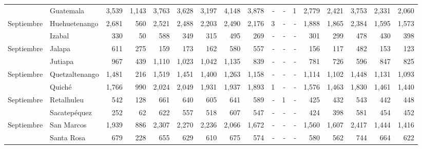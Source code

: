 \begin{landscape}
\begin{center}
\begin{longtable}{llrrrrrrrrrrrrrrr}
			\rowcolor{color1!5!white}\multicolumn{1}{l}{	\footnotesize	 Septiembre 	}&	 Guatemala 	&	 3,539 	&	 1,143 	&	 3,763 	&	 3,628 	&	 3,197 	&	 4,148 	&	 3,878 	&	 -   	&	 -   	&	 1 	&	 2,779 	&	 2,421 	&	 3,753 	&	 2,331 	&	 2,060 	\\
			\multicolumn{1}{l}{	\footnotesize	 Septiembre 	}&	 Huehuetenango 	&	 2,681 	&	 560 	&	 2,521 	&	 2,488 	&	 2,203 	&	 2,490 	&	 2,176 	&	 3 	&	 -   	&	 -   	&	 1,888 	&	 1,865 	&	 2,384 	&	 1,595 	&	 1,573 	\\
			\rowcolor{color1!5!white}\multicolumn{1}{l}{	\footnotesize	 Septiembre 	}&	 Izabal 	&	 330 	&	 50 	&	 588 	&	 349 	&	 315 	&	 495 	&	 269 	&	 -   	&	 -   	&	 -   	&	 301 	&	 299 	&	 478 	&	 430 	&	 398 	\\
			\multicolumn{1}{l}{	\footnotesize	 Septiembre 	}&	 Jalapa 	&	 611 	&	 275 	&	 159 	&	 173 	&	 162 	&	 580 	&	 557 	&	 -   	&	 -   	&	 -   	&	 156 	&	 117 	&	 482 	&	 153 	&	 123 	\\
			\rowcolor{color1!5!white}\multicolumn{1}{l}{	\footnotesize	 Septiembre 	}&	 Jutiapa 	&	 967 	&	 439 	&	 1,110 	&	 1,023 	&	 1,042 	&	 1,135 	&	 839 	&	 -   	&	 -   	&	 -   	&	 781 	&	 726 	&	 596 	&	 847 	&	 825 	\\
			\multicolumn{1}{l}{	\footnotesize	 Septiembre 	}&	 Quetzaltenango 	&	 1,481 	&	 216 	&	 1,519 	&	 1,451 	&	 1,400 	&	 1,263 	&	 1,158 	&	 -   	&	 -   	&	 -   	&	 1,114 	&	 1,102 	&	 1,448 	&	 1,131 	&	 1,093 	\\
			\rowcolor{color1!5!white}\multicolumn{1}{l}{	\footnotesize	 Septiembre 	}&	 Quiché 	&	 1,766 	&	 990 	&	 2,024 	&	 2,049 	&	 1,931 	&	 1,937 	&	 1,893 	&	 1 	&	 -   	&	 -   	&	 1,576 	&	 1,463 	&	 1,830 	&	 1,461 	&	 1,440 	\\
			\multicolumn{1}{l}{	\footnotesize	 Septiembre 	}&	 Retalhuleu 	&	 542 	&	 128 	&	 661 	&	 640 	&	 605 	&	 641 	&	 589 	&	 -   	&	 1 	&	 -   	&	 425 	&	 432 	&	 543 	&	 442 	&	 448 	\\
			\rowcolor{color1!5!white}\multicolumn{1}{l}{	\footnotesize	 Septiembre 	}&	 Sacatepéquez 	&	 252 	&	 62 	&	 622 	&	 557 	&	 518 	&	 607 	&	 547 	&	 -   	&	 -   	&	 -   	&	 424 	&	 398 	&	 581 	&	 454 	&	 452 	\\
			\multicolumn{1}{l}{	\footnotesize	 Septiembre 	}&	 San Marcos 	&	 1,939 	&	 886 	&	 2,307 	&	 2,270 	&	 2,236 	&	 2,066 	&	 1,672 	&	 -   	&	 -   	&	 -   	&	 1,560 	&	 1,607 	&	 2,417 	&	 1,444 	&	 1,416 	\\
			\rowcolor{color1!5!white}\multicolumn{1}{l}{	\footnotesize	 Septiembre 	}&	 Santa Rosa 	&	 679 	&	 228 	&	 655 	&	 629 	&	 610 	&	 675 	&	 574 	&	 -   	&	 -   	&	 -   	&	 580 	&	 562 	&	 744 	&	 664 	&	 622 	\\

\end{longtable}
\end{center}
\end{landscape}
